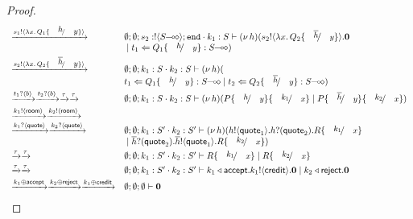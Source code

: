 \begin{proof}
\[\begin{array}{ll}
		\by{\bactout{s_1}{\abs{x}{Q_1 \subst{h}{y}}}}&
		\es; \es; s_2: \btout{\lhot{S}} \tinact \cat k_1: S \proves \newsp{h}{\bout{s_2}{\abs{x}{Q_2 \subst{\dual{h}}{y}}} \inact\\
		& \Par \ftrigger{t_1}{Q_1 \subst{h}{y}}{\lhot{S}}}
\\[1mm]

		\by{\bactout{s_2}{\abs{x}{Q_2 \subst{\dual{h}}{y}}}}&
		\es; \es; k_1: S \cat k_2: S \proves \newsp{h}{\\
		& \ftrigger{t_1}{Q_1 \subst{h}{y}}{\lhot{S}} \Par \ftrigger{t_2}{Q_2 \subst{\dual{h}}{y}}{\lhot{S}}}
\\[1mm]

		\by{\bactinp{t_1}{b}} \by{\bactinp{t_2}{b}} \by{\tau}\by{\tau}&
		\es; \es; k_1: S \cat k_2: S \proves \newsp{h}{
		P\subst{h}{y} \subst{k_1}{x} \Par P\subst{\dual{h}}{y} \subst{k_2}{x}}
\\[1mm]

		\by{\bactout{k_1}{\rtype}} \by{\bactout{k_2}{\rtype}}\\
		\by{\bactinp{k_1}{\Quote}} \by{\bactinp{k_2}{\Quote}}
		& \es; \es; k_1: S' \cat k_2: S' \proves \newsp{h}{
		\bout{h}{\Quote_1} \binp{h}{\Quote_2} R \subst{k_1}{x} \\
		& \Par \binp{\dual{h}}{\Quote_2} \bout{\dual{h}}{\Quote_1} R \subst{k_2}{x}}
\\[1mm]
		\by{\tau} \by{\tau}&
		\es; \es; k_1: S' \cat k_2: S' \proves R \subst{k_1}{x} \Par R \subst{k_2}{x}
\\[1mm]
		\by{\tau} \by{\tau}&
		\es; \es; k_1: S' \cat k_2: S' \proves
		\bsel{k_1}{\accept} \bout{k_1}{\creditc} \inact 
		\Par \bsel{k_2}{\reject} \inact
\\[1mm]
		\by{\bactsel{k_1}{\accept}} \by{\bactsel{k_2}{\reject}} \by{\bactsel{k_1}{\creditc}}&
		\es; \es; \es \proves \inact
	\end{array}
\]
\end{proof}

